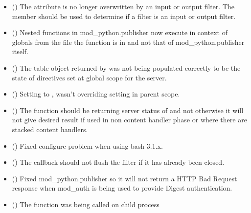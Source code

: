   \begin{itemize}
    \item
      ()
      The  attribute is no longer overwritten by an input
      or output filter. The  member should be used
      to determine if a filter is an input or output filter.
    \item
      ()
      Nested  functions in mod_python.publisher now execute
      in context of globals from the file the function is in and not that
      of mod_python.publisher itself.
    \item
      ()
      The table object returned by  was not
      being populated correctly to be the state of directives set at global
      scope for the server.
    \item
      ()
      Setting  to , wasn't overriding 
      setting in parent scope.
    \item
      ()
      The  function should be returning server status of
       and not  otherwise it will not give
      desired result if used in non content handler phase or where there are
      stacked content handlers.
    \item
      ()
      Fixed configure problem when using bash 3.1.x.
    \item
      ()
      The  callback should not flush the filter if it
      has already been closed.
    \item
      ()
      Fixed mod_python.publisher so it will not return a HTTP Bad Request
      response when mod_auth is being used to provide Digest authentication.
    \item
      ()
      The  function was being called on child process

\end{itemize}
